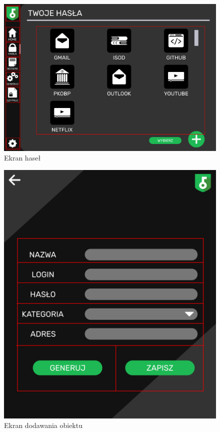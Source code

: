 \documentclass[a4paper]{article}
\begin{document}
\begin{figure}[H]
    \centering
    \includegraphics[width=1\textwidth]{img/ekran_hasel.png}
    \caption{Ekran haseł}
    \label{fig:hasla}
\end{figure}

\begin{figure}[H]
    \centering
    \includegraphics[height=1\textwidth]{img/ekran_dodania.png}
    \caption{Ekran dodawania obiektu}
    \label{fig:haslaDodanie}
\end{figure}
\end{document}
